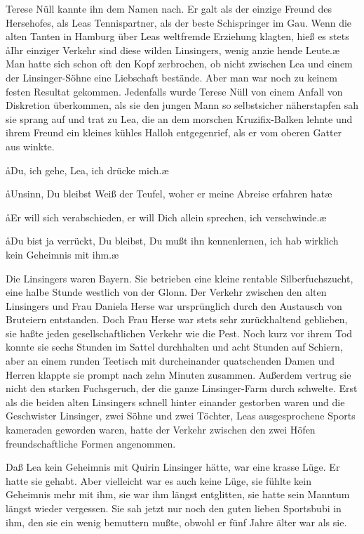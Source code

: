 Terese Nüll kannte ihn dem Namen nach. Er galt als der einzige
Freund des Hersehofes, als Leas Tennispartner, als der beste
Schispringer im Gau. Wenn die alten Tanten in Hamburg
über Leas weltfremde Erziehung klagten, hieß es stets\dopp{} \aa{}Ihr
einziger Verkehr sind diese wilden Linsingers, wenig anzie\-%
hende Leute.\ae{} Man hatte sich schon oft den Kopf zerbrochen,
ob nicht zwischen Lea und einem der Linsinger-Söhne eine
Liebschaft bestände. Aber man war noch zu keinem festen
Resultat gekommen. Jedenfalls wurde Terese Nüll von einem
Anfall von Diskretion überkommen, als sie den jungen Mann
so selbstsicher näherstapfen sah\dopp{} sie sprang auf und trat zu Lea,
die an dem morschen Kruzifix-Balken lehnte und ihrem
Freund ein kleines kühles Halloh entgegenrief, als er vom
oberen Gatter aus winkte.

\aa{}Du, ich gehe, Lea, ich drücke mich.\ae{}

\aa{}Unsinn, Du bleibst\ausr{} Weiß der Teufel, woher er meine Abreise
erfahren hat\ausr{}\ae{}

\aa{}Er will sich verabschieden, er will Dich allein sprechen, ich
verschwinde.\ae{}

\aa{}Du bist ja verrückt, Du bleibst, Du mußt ihn kennenlernen,
ich hab wirklich kein Geheimnis mit ihm.\ae{}

Die Linsingers waren Bayern. Sie betrieben eine kleine
rentable Silberfuchszucht, eine halbe Stunde westlich von
der Glonn. Der Verkehr zwischen den alten Linsingers und
Frau Daniela Herse war ursprünglich durch den Austausch
von Bruteiern entstanden. Doch Frau Herse war stets sehr
zurückhaltend geblieben, sie haßte jeden gesellschaftlichen
Verkehr wie die Pest. Noch kurz vor ihrem Tod konnte sie
sechs Stunden im Sattel durchhalten und acht Stunden auf
Schiern, aber an einem runden Teetisch mit durcheinander\-%
quatschenden Damen und Herren klappte sie prompt nach
zehn Minuten zusammen. Außerdem vertrug sie nicht den
starken Fuchsgeruch, der die ganze Linsinger-Farm durch\-%
schwelte. Erst als die beiden alten Linsingers schnell hinter\-%
einander gestorben waren und die Geschwister Linsinger,
zwei Söhne und zwei Töchter, Leas ausgesprochene Sports\-%
kameraden geworden waren, hatte der Verkehr zwischen den
zwei Höfen freundschaftliche Formen angenommen.

Daß Lea kein Geheimnis mit Quirin Linsinger hätte, war eine
krasse Lüge. Er hatte sie gehabt. Aber vielleicht war es auch
keine Lüge, sie fühlte kein Geheimnis mehr mit ihm, sie war
ihm längst entglitten, sie hatte sein Manntum längst wieder
vergessen. Sie sah jetzt nur noch den guten lieben Sportsbubi
in ihm, den sie ein wenig bemuttern mußte, obwohl er fünf
Jahre älter war als sie.

